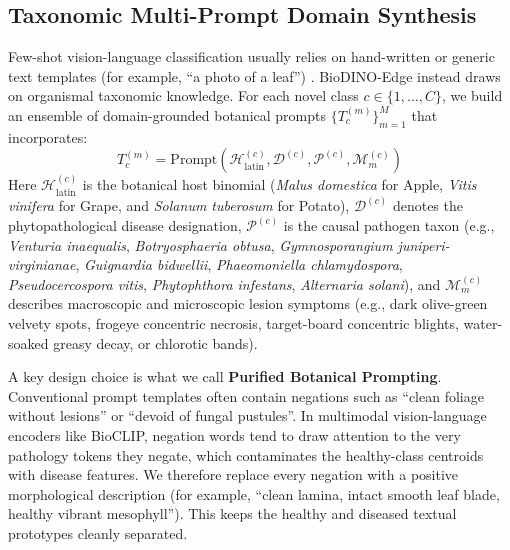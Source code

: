 \documentclass[conference]{IEEEtran}
\begin{document}
\subsection{Taxonomic Multi-Prompt Domain Synthesis}
Few-shot vision-language classification usually relies on hand-written or generic text templates (for example, ``a photo of a leaf'') \cite{radford2021clip, zhou2022coop}. BioDINO-Edge instead draws on organismal taxonomic knowledge. For each novel class $c \in \{1, \dots, C\}$, we build an ensemble of domain-grounded botanical prompts $\{T_c^{(m)}\}_{m=1}^M$ that incorporates:
\begin{equation}
T_c^{(m)} = \text{Prompt}\left(\mathcal{H}_{\text{latin}}^{(c)}, \mathcal{D}^{(c)}, \mathcal{P}^{(c)}, \mathcal{M}_m^{(c)}\right)
\end{equation}
Here $\mathcal{H}_{\text{latin}}^{(c)}$ is the botanical host binomial (\textit{Malus domestica} for Apple, \textit{Vitis vinifera} for Grape, and \textit{Solanum tuberosum} for Potato), $\mathcal{D}^{(c)}$ denotes the phytopathological disease designation, $\mathcal{P}^{(c)}$ is the causal pathogen taxon (e.g., \textit{Venturia inaequalis}, \textit{Botryosphaeria obtusa}, \textit{Gymnosporangium juniperi-virginianae}, \textit{Guignardia bidwellii}, \textit{Phaeomoniella chlamydospora}, \textit{Pseudocercospora vitis}, \textit{Phytophthora infestans}, \textit{Alternaria solani}), and $\mathcal{M}_m^{(c)}$ describes macroscopic and microscopic lesion symptoms (e.g., dark olive-green velvety spots, frogeye concentric necrosis, target-board concentric blights, water-soaked greasy decay, or chlorotic bands).

A key design choice is what we call \textbf{Purified Botanical Prompting}. Conventional prompt templates often contain negations such as ``clean foliage without lesions'' or ``devoid of fungal pustules''. In multimodal vision-language encoders like BioCLIP, negation words tend to draw attention to the very pathology tokens they negate, which contaminates the healthy-class centroids with disease features. We therefore replace every negation with a positive morphological description (for example, ``clean lamina, intact smooth leaf blade, healthy vibrant mesophyll''). This keeps the healthy and diseased textual prototypes cleanly separated.
\end{document}
